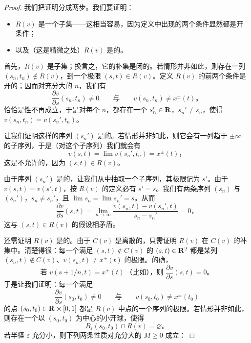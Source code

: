 \begin{proof}
我们把证明分成两步。我们要证明：
\begin{itemize}
\item $R(v)$ 是一个\trOpen{}子集——这相当容易，因为定义中出现的两个条件显然都是开条件；
\item 以及（这是精微之处）$R(v)$ 是\trDense{}的。
\end{itemize}

首先，$R(v)$ 是\trOpen{}子集；换言之，它的补集是闭的。若情形并非如此，则存在一列 $(s_n,t_n)\notin R(v)$，\trConvergence{}到一个极限 $(s,t)\in R(v)$。定义 $R(v)$ 的前两个条件是开的；因而对充分大的 $n$，我们有
\[
\frac{\partial v}{\partial s}(s_n,t_n)\neq 0
\qquad\text{与}\qquad
v(s_n,t_n)\neq x^\pm(t)\text{。}
\]
恰恰是\trInjective{}性不再成立，于是对每个 $n$，都存在一个 $s_n'\in\mathbf{R}$，$s_n'\neq s_n$，使得 $v(s_n,t_n)=v(s_n',t_n)$。

让我们证明这样的序列 $(s_n')$ 是\trBounded{}的。若情形并非如此，则它会有一列趋于 $\pm\infty$ 的子序列，于是（对这个子序列）我们就会有
\[
v(s,t)=\lim v(s_n',t_n)=x^\pm(t)\text{，}
\]
这是不允许的，因为 $(s,t)\in R(v)$。

由于序列 $(s_n')$ 是\trBounded{}的，让我们从中抽取一个\trConvergence{}子序列，其极限记为 $s'$。由于 $v(s,t)=v(s',t)$，按 $R(v)$ 的定义必有 $s'=s$。我们有两条序列 $(s_n)$ 与 $(s_n')$，$s_n\neq s_n'$，且 $\lim s_n=\lim s_n'=s$。从而
\[
\frac{\partial v}{\partial s}(s,t)=\lim_{n\to\infty}\frac{v(s_n,t)-v(s_n',t)}{s_n-s_n'}=0\text{，}
\]
这与 $(s,t)\in R(v)$ 的假设相矛盾。

还需证明 $R(v)$ 是\trDense{}的。由于 $C(v)$ 是离散的，只需证明 $R(v)$ 在 $C(v)$ 的补集中\trDense。清楚得很：每一个满足 $(s,t)\notin C(v)$ 的 $(s,t)\in\mathbf{R}^2$ 都是某列 $(s_n,t)\notin C(v)$、$v(s_n,t)\neq x^\pm(t)$ 的极限。的确，
\[
\text{若 }v(s+1/n,t)=x^+(t)\ \text{（比如），则 }\frac{\partial v}{\partial s}(s,t)=0\text{。}
\]
于是让我们证明：每一个满足
\[
\frac{\partial v}{\partial s}(s_0,t_0)\neq 0
\qquad\text{与}\qquad
v(s_0,t_0)\neq x^\pm(t_0)
\]
的点 $(s_0,t_0)\in\mathbf{R}\times[0,1]$ 都是 $R(v)$ 中点的一个序列的极限。若情形并非如此，则存在一个以 $(s_0,t_0)$ 为中心的小开球，使得
\[
B_\varepsilon(s_0,t_0)\cap R(v)=\varnothing\text{。}
\]
若半径 $\varepsilon$ 充分小，则下列两条性质对充分大的 $M\ge 0$ 成立：


\end{proof}
